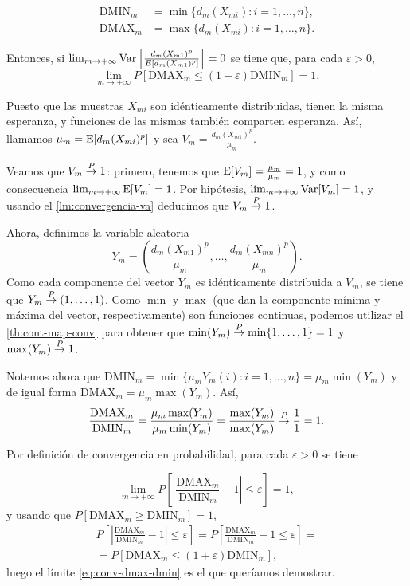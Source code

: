 \begin{align*}
  \mathrm{DMIN}_{m}&=\min\{d_m(X_{mi}):i=1,\dots,n\},\\
  \mathrm{DMAX}_{m}&=\max\{d_m(X_{mi}):i=1,\dots,n\}.
\end{align*}

Entonces, si
\(\lim_{m\rightarrow +\infty}\mathrm{Var}\left[\frac{d_m(X_{m1})^p}{E[d_m(X_{m1})^p]}\right]=0\)
se tiene que, para cada \(\varepsilon > 0\),
\[\lim_{m\rightarrow +\infty}P\left[\mathrm{DMAX}_m\leq (1+\varepsilon) \mathrm{DMIN}_m\right]=1.\]
\proofb

Puesto que las muestras \(X_{mi}\) son idénticamente distribuidas,
tienen la misma esperanza, y funciones de las mismas también comparten
esperanza. Así, llamamos \(\mu_m = \mathrm{E}[d_m(X_{mi})^p]\) y sea
\(V_m =\frac{d_m(X_{m1})^p}{\mu_m}\).

Veamos que \(V_m\overset{P}{\rightarrow} 1\): primero, tenemos que
\(\mathrm{E}[V_m] = \frac{\mu_m}{\mu_m} = 1\), y como consecuencia
\(\lim_{m\rightarrow +\infty}\mathrm{E}[V_m] = 1\). Por hipótesis,
\(\lim_{m\rightarrow +\infty}\mathrm{Var}[V_m] = 1\), y usando el
\autoref{lm:convergencia-va} deducimos que \(V_m\overset{P}{\rightarrow} 1\).

Ahora, definimos la variable aleatoria
\[Y_m=\left(\frac{d_m(X_{m1})^p}{\mu_m}, \dots, \frac{d_m(X_{mn})^p}{\mu_m}\right).\]
Como cada componente del vector \(Y_m\) es idénticamente distribuida a
\(V_m\), se tiene que \(Y_m\overset{P}{\rightarrow} (1, \dots, 1)\). Como \(\min\) y
\(\max\) (que dan la componente mínima y máxima del vector,
respectivamente) son funciones continuas, podemos utilizar el \autoref{th:cont-map-conv} para obtener que
\(\min(Y_m)\overset{P}{\rightarrow} \min\{1, \dots, 1\} = 1\) y \(\max(Y_m)\overset{P}{\rightarrow} 1\).

Notemos ahora que
\(\mathrm{DMIN}_m= \min\{\mu_m Y_m(i):i=1,\dots,n\}=\mu_m \min(Y_m)\) y
de igual forma \(\mathrm{DMAX}_m=\mu_m \max(Y_m)\). Así,
\[ \frac{\mathrm{DMAX}_m}{\mathrm{DMIN}_m}=\frac{\mu_m \max(Y_m)}{\mu_m \min(Y_m)}=\frac{\max(Y_m)}{\max(Y_m)}\overset{P}{\rightarrow} \frac 1 1= 1.\]

Por definición de convergencia en probabilidad, para cada
\(\varepsilon>0\) se tiene

\begin{equation}
  \label{eq:conv-dmax-dmin}
  \lim_{m\rightarrow +\infty} P\left[\left\lvert \frac{\mathrm{DMAX}_m}{\mathrm{DMIN}_m} - 1 \right\rvert\leq\varepsilon\right] = 1,
  \end{equation}
y usando que \(P\left[\mathrm{DMAX}_m \geq \mathrm{DMIN}_m \right]=1\),
\begin{gather*}
  P\left[\left\lvert \frac{\mathrm{DMAX}_m}{\mathrm{DMIN}_m} - 1 \right\rvert\leq\varepsilon\right]=
P\left[\frac{\mathrm{DMAX}_m}{\mathrm{DMIN}_m} - 1 \leq\varepsilon\right]=\\=
P\left[\mathrm{DMAX}_m\leq (1+ \varepsilon)\mathrm{DMIN}_m \right],
\end{gather*}
luego el límite \eqref{eq:conv-dmax-dmin} es el que queríamos demostrar.
\proofe
\theoe

